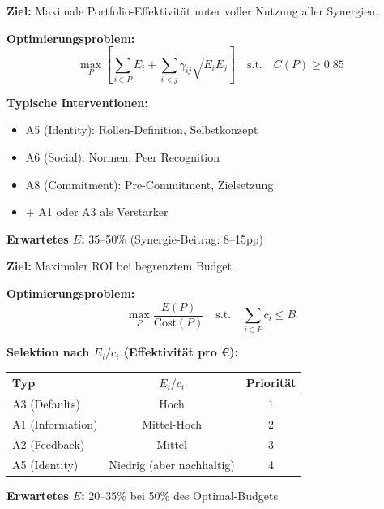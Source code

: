 \begin{tcolorbox}[colback=yellow!5!white, colframe=yellow!75!black,
    title=\textbf{Archetyp 2: ⭐ Optimal Mix Portfolio}]
\textbf{Ziel:} Maximale Portfolio-Effektivität unter voller Nutzung aller Synergien.

\textbf{Optimierungsproblem:}
\begin{equation}
\max_{P} \left[ \sum_{i \in P} E_i + \sum_{i<j} \gamma_{ij} \sqrt{E_i E_j} \right] \quad \text{s.t.} \quad C(P) \geq 0.85
\end{equation}

\textbf{Typische Interventionen:}
\begin{itemize}[nosep]
\item A5 (Identity): Rollen-Definition, Selbstkonzept
\item A6 (Social): Normen, Peer Recognition
\item A8 (Commitment): Pre-Commitment, Zielsetzung
\item + A1 oder A3 als Verstärker
\end{itemize}

\textbf{Erwartetes $E$:} 35--50\% (Synergie-Beitrag: 8--15pp)
\end{tcolorbox}

\begin{tcolorbox}[colback=green!5!white, colframe=green!75!black,
    title=\textbf{Archetyp 3: 💰 Budget-Constrained Portfolio}]
\textbf{Ziel:} Maximaler ROI bei begrenztem Budget.

\textbf{Optimierungsproblem:}
\begin{equation}
\max_{P} \frac{E(P)}{\text{Cost}(P)} \quad \text{s.t.} \quad \sum_{i \in P} c_i \leq B
\end{equation}

\textbf{Selektion nach $E_i / c_i$ (Effektivität pro €):}
\begin{center}
\begin{tabular}{@{}lcc@{}}
\toprule
\textbf{Typ} & \textbf{$E_i / c_i$} & \textbf{Priorität} \\
\midrule
A3 (Defaults) & Hoch & 1 \\
A1 (Information) & Mittel-Hoch & 2 \\
A2 (Feedback) & Mittel & 3 \\
A5 (Identity) & Niedrig (aber nachhaltig) & 4 \\
\bottomrule
\end{tabular}
\end{center}

\textbf{Erwartetes $E$:} 20--35\% bei 50\% des Optimal-Budgets
\end{tcolorbox}


